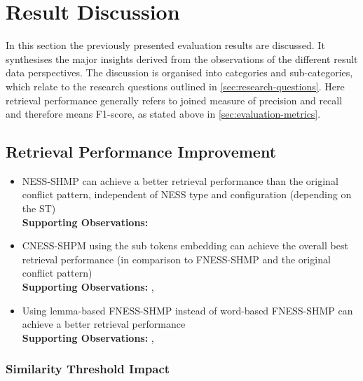 \documentclass[11pt]{scrreprt}
\begin{document}
\section{Result Discussion}
\label{sec:result-discussion}
In this section the previously presented evaluation results are discussed. It synthesises the major insights derived from the observations of the different result data perspectives. The discussion is organised into categories and sub-categories, which relate to the research questions outlined in \cref{sec:research-questions}. Here retrieval performance generally refers to joined measure of precision and recall and therefore means F1-score, as stated above in \cref{sec:evaluation-metrics}. 


\subsection{Retrieval Performance Improvement}

\begin{itemize}

\item NESS-SHMP can achieve a better retrieval performance than the original conflict pattern, independent of NESS type and configuration (depending on the ST) \\
\textbf{Supporting Observations:} 

\item CNESS-SHPM using the sub tokens embedding can achieve the overall best retrieval performance (in comparison to FNESS-SHMP and the original conflict pattern) \\
\textbf{Supporting Observations:} , 

\item Using lemma-based FNESS-SHMP instead of word-based FNESS-SHMP can achieve a better retrieval performance \\
\textbf{Supporting Observations:} , 

\end{itemize}


\subsubsection{Similarity Threshold Impact}
\end{document}
